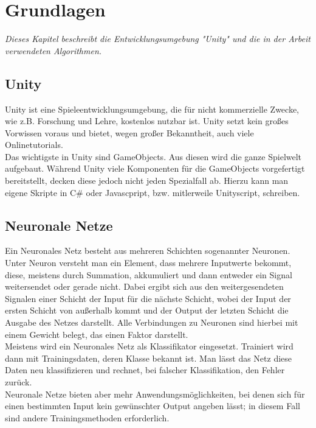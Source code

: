 \documentclass[
	12pt,
	a4paper,
	BCOR10mm,
	DIV14,
	headsepline,
	usegeometry,
]{scrreprt}
\begin{document}
\chapter{Grundlagen}
\label{basics}

\textit{%
Dieses Kapitel beschreibt die Entwicklungsumgebung "Unity" und die in der Arbeit verwendeten Algorithmen.}

\section{Unity}
Unity \cite{Unity} ist eine Spieleentwicklungsumgebung, die für nicht kommerzielle Zwecke, wie z.B. Forschung und Lehre, kostenlos nutzbar ist. Unity setzt kein großes Vorwissen voraus und bietet, wegen großer Bekanntheit, auch viele Onlinetutorials.\\
Das wichtigste in Unity sind GameObjects. Aus diesen wird die ganze Spielwelt aufgebaut. Während Unity viele Komponenten für die GameObjects vorgefertigt bereitstellt, decken diese jedoch nicht jeden Spezialfall ab. Hierzu kann man eigene Skripte in C\# oder Javascpript, bzw. mitlerweile Unityscript, schreiben.


\section{Neuronale Netze}
Ein Neuronales Netz besteht aus mehreren Schichten sogenannter Neuronen. Unter Neuron versteht man ein Element, dass mehrere Inputwerte bekommt, diese, meistens durch Summation, akkumuliert und dann entweder ein Signal weitersendet oder gerade nicht. Dabei ergibt sich aus den weitergesendeten Signalen einer Schicht der Input für die nächste Schicht, wobei der Input der ersten Schicht von außerhalb kommt und der Output der letzten Schicht die Ausgabe des Netzes darstellt. Alle Verbindungen zu Neuronen sind hierbei mit einem Gewicht belegt, das einen Faktor darstellt.\\ Meistens wird ein Neuronales Netz als Klassifikator eingesetzt. Trainiert wird dann mit Trainingsdaten, deren Klasse bekannt ist. Man lässt das Netz diese Daten neu klassifizieren und rechnet, bei falscher Klassifikation, den Fehler zurück.\\
Neuronale Netze bieten aber mehr Anwendungsmöglichkeiten, bei denen sich für einen bestimmten Input kein gewünschter Output angeben lässt; in diesem Fall sind andere Trainingsmethoden erforderlich.

\pagebreak
\end{document}
